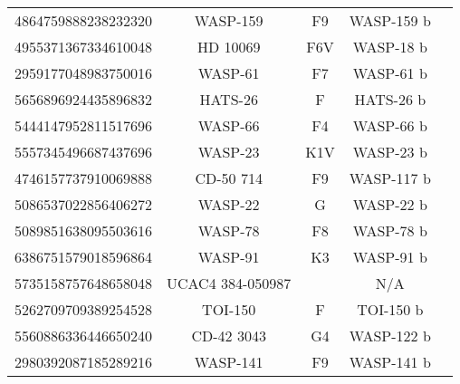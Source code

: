 \begin{table}
\begin{tabular}{c c c c c}
        4864759888238232320 & WASP-159  & F9  &  WASP-159 b & \footnotemark[1] \footnotemark[2] \footnotemark[3] \footnotemark[4] \footnotemark[5]  \\
        4955371367334610048 &  HD 10069 & F6V  &  WASP-18 b &  \footnotemark[1] \footnotemark[2] \footnotemark[3] \footnotemark[4] \footnotemark[5]  \\
         2959177048983750016 & WASP-61  & F7  & WASP-61 b  & \footnotemark[1] \footnotemark[2] \footnotemark[3] \footnotemark[4] \footnotemark[5]  \\
         5656896924435896832 & HATS-26  & F  & HATS-26 b  & \footnotemark[1] \footnotemark[2] \footnotemark[3] \footnotemark[4] \footnotemark[5]  \\
        5444147952811517696  & WASP-66  & F4  & WASP-66 b  & \footnotemark[1] \footnotemark[2] \footnotemark[3] \footnotemark[4] \footnotemark[5]   \\
         5557345496687437696  & WASP-23  & K1V  & WASP-23 b  & \footnotemark[1] \footnotemark[2] \footnotemark[3] \footnotemark[4] \footnotemark[5]   \\
         4746157737910069888 & CD-50 714  & F9  & WASP-117 b  & \footnotemark[1] \footnotemark[2] \footnotemark[3] \footnotemark[4] \footnotemark[5]   \\
         5086537022856406272 & WASP-22  &  G &  WASP-22 b &  \footnotemark[1] \footnotemark[2] \footnotemark[3] \footnotemark[4] \footnotemark[5]  \\
         5089851638095503616 & WASP-78  & F8  & WASP-78 b  & \footnotemark[1] \footnotemark[2] \footnotemark[3] \footnotemark[4] \footnotemark[5]   \\
          6386751579018596864 & WASP-91  & K3  & WASP-91 b  & \footnotemark[1] \footnotemark[2] \footnotemark[3] \footnotemark[4] \footnotemark[5]   \\
         5735158757648658048 & UCAC4 384-050987  &   & N/A &  \footnotemark[1] \footnotemark[2] \footnotemark[4] \footnotemark[5] \\
         5262709709389254528 & TOI-150  &  F &  TOI-150 b & \footnotemark[1] \footnotemark[2] \footnotemark[3] \footnotemark[4] \footnotemark[5]   \\
         5560886336446650240 & CD-42 3043  & G4  & WASP-122 b  & \footnotemark[1] \footnotemark[2] \footnotemark[3] \footnotemark[4] \footnotemark[5]   \\
         2980392087185289216 & WASP-141  & F9  & WASP-141 b  & \footnotemark[1] \footnotemark[2] \footnotemark[3] \footnotemark[4] \footnotemark[5]  \\

\end{tabular}
\end{table}
